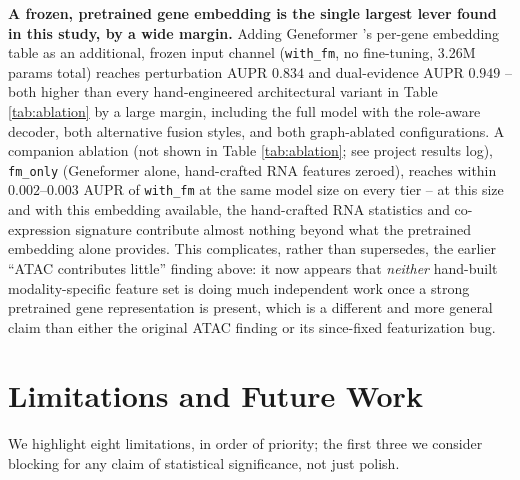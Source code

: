 \documentclass{article}
\theoremstyle{plain}
\theoremstyle{definition}
\begin{document}
\textbf{A frozen, pretrained gene embedding is the single largest lever
found in this study, by a wide margin.} Adding Geneformer
\cite{theodoris2023geneformer}'s per-gene embedding table as an additional,
frozen input channel (\texttt{with\_fm}, no fine-tuning, 3.26M params total)
reaches perturbation AUPR $0.834$ and dual-evidence AUPR $0.949$ -- both
higher than every hand-engineered architectural variant in Table
\ref{tab:ablation} by a large margin, including the full model with the
role-aware decoder, both alternative fusion styles, and both graph-ablated
configurations. A companion ablation (not shown in Table
\ref{tab:ablation}; see project results log), \texttt{fm\_only} (Geneformer
alone, hand-crafted RNA features zeroed), reaches within $0.002$--$0.003$
AUPR of \texttt{with\_fm} at the same model size on every tier -- at this
size and with this embedding available, the hand-crafted RNA statistics and
co-expression signature contribute almost nothing beyond what the
pretrained embedding alone provides. This complicates, rather than
supersedes, the earlier ``ATAC contributes little'' finding above: it now
appears that \emph{neither} hand-built modality-specific feature set is
doing much independent work once a strong pretrained gene representation is
present, which is a different and more general claim than either the
original ATAC finding or its since-fixed featurization bug.

\section{Limitations and Future Work}
\label{sec:limitations}

We highlight eight limitations, in order of priority; the first three we
consider blocking for any claim of statistical significance, not just
polish.
\end{document}
